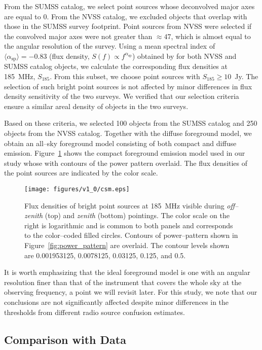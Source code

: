 \documentclass[preprint2,iop,numberedappendix]{emulateapj}
\begin{document}
From the SUMSS catalog, we select point sources whose deconvolved major axes are equal to 0\arcsec. From the NVSS catalog, we excluded objects that overlap with those in the SUMSS survey footprint. Point sources from NVSS were selected if the convolved major axes were not greater than $\approx 47$\arcsec, which is almost equal to the angular resolution of the survey. Using a mean spectral index of $\langle\alpha_\textrm{sp}\rangle=-0.83$ (flux density, $S(f)\propto f^{\alpha_\textrm{sp}}$) obtained by \citet{mau03} for both NVSS and SUMSS catalog objects, we calculate the corresponding flux densities at 185~MHz, $S_{185}$. From this subset, we choose point sources with $S_{185}\geq 10$~Jy. The selection of such bright point sources is not affected by minor differences in flux density sensitivity of the two surveys. We verified that our selection criteria ensure a similar areal density of objects in the two surveys. 

Based on these criteria, we selected 100 objects from the SUMSS catalog and 250 objects from the NVSS catalog. Together with the diffuse foreground model, we obtain an all--sky foreground model consisting of both compact and diffuse emission. Figure~\ref{fig:CSM} shows the compact foreground emission model used in our study whose with contours of the power pattern overlaid. The flux densities of the point sources are indicated by the color scale. 

\begin{figure}[htb]
\centering
\texttt{[image: figures/v1\_0/csm.eps]}
\caption{Flux densities of bright point sources at 185~MHz visible during {\it off--zenith} (top) and {\it zenith} (bottom) pointings. The color scale on the right is logarithmic and is common to both panels and corresponds to the color--coded filled circles. Contours of power--pattern shown in Figure~\ref{fig:power_pattern} are overlaid. The contour levels shown are 0.001953125, 0.0078125, 0.03125, 0.125, and 0.5. \label{fig:CSM}}
\end{figure}

It is worth emphasizing that the ideal foreground model is one with an angular resolution finer than that of the instrument that covers the whole sky at the observing frequency, a point we will revisit later. For this study, we note that our conclusions are not significantly affected despite minor differences in the thresholds from different radio source confusion estimates.

\subsection{Comparison with Data}\label{sec:data-vs-model}
\end{document}
